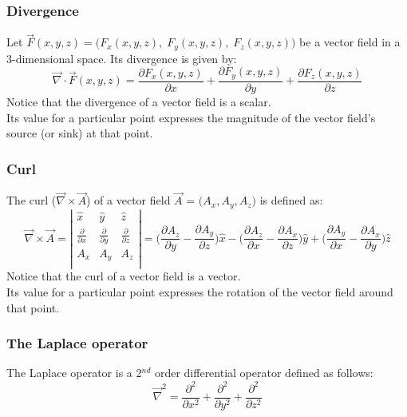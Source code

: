 \documentclass[english,11pt]{article}
\begin{document}
\subsubsection*{\bf Divergence}
Let $\vec{F}(x,y,z)=\Big(F_{x}(x,y,z), \; F_{y}(x,y,z), \; F_{z}(x,y,z) \Big)$
be a vector field in a 3-dimensional space. Its divergence is given by:
\begin{equation*}
   \vec\nabla \cdot \vec{F}(x,y,z) =
       \frac{\partial F_{x}(x,y,z)}{\partial x} +
       \frac{\partial F_{y}(x,y,z)}{\partial y} +
       \frac{\partial F_{z}(x,y,z)}{\partial z}
\end{equation*}
Notice that the divergence of a vector field is a scalar.\\
Its value for a particular point expresses the magnitude of the vector field's source (or sink) at that point.

\subsubsection*{\bf Curl}
The curl ($\vec{\nabla} \times \vec{A}$) of a vector
field $\vec{A}$ = $\Big(A_x, A_y, A_z \Big)$ is defined as:
\begin{equation*}
     \vec{\nabla} \times \vec{A} =
       \left|
          \begin{array}{ccc}
             \hat{x} & \hat{y} & \hat{z} \\
             \frac{\partial}{\partial x}  & \frac{\partial}{\partial y} & \frac{\partial}{\partial z} \\
             A_x     & A_y     & A_z     \\
          \end{array}
       \right| =
       \Big( \frac{\partial A_z}{\partial y} - \frac{\partial A_y}{\partial z} \Big) \hat{x} -
       \Big( \frac{\partial A_z}{\partial x} - \frac{\partial A_x}{\partial z} \Big) \hat{y} +
       \Big( \frac{\partial A_y}{\partial x} - \frac{\partial A_x}{\partial y} \Big) \hat{z}
\end{equation*}
Notice that the curl of a vector field is a vector.\\
Its value for a particular point expresses the rotation of the vector field
around that point.

\subsubsection*{\bf The Laplace operator}

The Laplace operator is a 2$^{nd}$ order differential operator defined as follows:
\begin{equation*}
  \vec{\nabla}^{2} = \frac{\partial^2}{\partial x^2} + \frac{\partial^2}{\partial y^2} + \frac{\partial^2}{\partial z^2}
\end{equation*}
\end{document}
